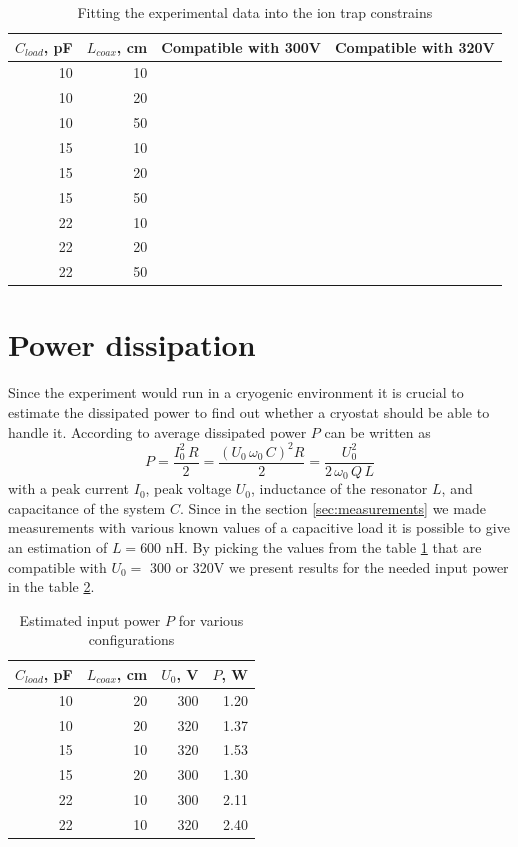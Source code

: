 \begin{table}[h]
\centering
\begin{tabular}{| r | r | c | c |}
	\hline
	$C_{load}$, pF & $L_{coax}$, cm & Compatible with 300V & Compatible with 320V\\
	\hline \hline
	10 & 10 & \xmark & \xmark\\
	\hline
	10 & 20 & \cmark & \cmark\\
	\hline
	10 & 50 & \xmark & \xmark\\
	\hline
	15 & 10 & \xmark & \cmark\\
	\hline
	15 & 20 & \cmark & \xmark\\
	\hline
	15 & 50 & \xmark & \xmark\\
	\hline
	22 & 10 & \cmark & \cmark\\
	\hline
	22 & 20 & \xmark & \xmark\\
	\hline
	22 & 50 & \xmark & \xmark\\
	\hline
\end{tabular}
\label{tbl:ideal_drive}
\caption{Fitting the experimental data into the ion trap constrains}
\end{table}

\section{Power dissipation}
Since the experiment would run in a cryogenic environment it is crucial to estimate the dissipated power to find out whether a cryostat should be able to handle it. According to \cite{Leupold2015} average dissipated power $P$ can be written as
\begin{equation}
	P = \frac{I_0^2 \, R}{2} = \frac{\left(U_0 \, \omega_0 \, C\right)^2 R}{2} = \frac{U_0^2}{2 \, \omega_0 \, Q  \, L}
\end{equation}
with a peak current $I_0$, peak voltage $U_0$, inductance of the resonator $L$, and capacitance of the system $C$. Since in the section \ref{sec:measurements} we made measurements with various known values of a capacitive load it is possible to give an estimation of $L = 600$ nH. By picking the values from the table \ref{tbl:ideal_drive} that are compatible with $U_0 = $ 300 or 320V we present results for the needed input power in the table \ref{tbl:input_power}.

\begin{table}[h]
\centering
\begin{tabular}{| r | r | r | r |}
	\hline
	$C_{load}$, pF & $L_{coax}$, cm & $U_0$, V & $P$, W\\
	\hline \hline
	10 & 20 & 300 & 1.20\\
	\hline
	10 & 20 & 320 & 1.37\\
	\hline
	15 & 10 & 320 & 1.53\\
	\hline
	15 & 20 & 300 & 1.30\\
	\hline
	22 & 10 & 300 & 2.11\\
	\hline
	22 & 10 & 320 & 2.40\\
	\hline
\end{tabular}
\label{tbl:input_power}
\caption{Estimated input power $P$ for various configurations}
\end{table}

